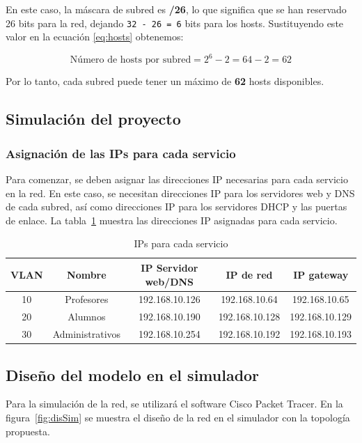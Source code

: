     En este caso, la máscara de subred es \textbf{/26}, lo que significa que se han reservado 26 bits para la red, dejando \texttt{32 - 26 = 6} bits para los hosts. Sustituyendo este valor en la ecuación \ref{eq:hosts} obtenemos:
    
    \begin{equation}
        \text{Número de hosts por subred} = 2^6 - 2 = 64 - 2 = 62
    \end{equation}
    
    Por lo tanto, cada subred puede tener un máximo de \textbf{62} hosts disponibles.

    \subsection{Simulación del proyecto}
    \subsubsection*{Asignación de las IPs para cada servicio}

    Para comenzar, se deben asignar las direcciones IP necesarias para cada servicio en la red. En este caso, se necesitan direcciones IP para los servidores web y DNS de cada subred, así como direcciones IP para los servidores DHCP y las puertas de enlace. La tabla~\ref{tab:redes} muestra las direcciones IP asignadas para cada servicio.

    \begin{table}[H]
        \begin{center}
            \begin{tabular}{ c | c | c | c | c }
                \textbf{VLAN} & \textbf{Nombre} & \textbf{IP Servidor web/DNS} & \textbf{IP de red} & \textbf{IP gateway}\\ \hline
                10 & Profesores & 192.168.10.126 & 192.168.10.64 & 192.168.10.65\\
                20 & Alumnos & 192.168.10.190 & 192.168.10.128 & 192.168.10.129\\
                30 & Administrativos & 192.168.10.254 & 192.168.10.192 & 192.168.10.193\\
            \end{tabular}
            \caption{IPs para cada servicio}
            \label{tab:redes}
        \end{center}
    \end{table}


    \subsection*{Diseño del modelo en el simulador}
    Para la simulación de la red, se utilizará el software Cisco Packet Tracer. En la figura~\ref{fig:disSim} se muestra el diseño de la red en el simulador con la topología propuesta.


